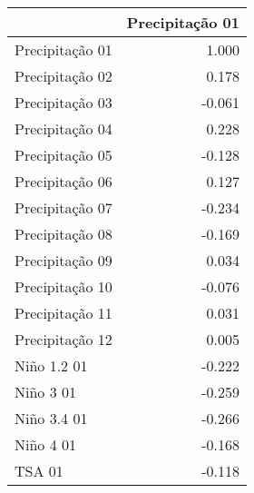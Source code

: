\begin{tabular}{lr}
\toprule
{} &  Precipitação 01 \\
\midrule
Precipitação 01 &            1.000 \\
Precipitação 02 &            0.178 \\
Precipitação 03 &           -0.061 \\
Precipitação 04 &            0.228 \\
Precipitação 05 &           -0.128 \\
Precipitação 06 &            0.127 \\
Precipitação 07 &           -0.234 \\
Precipitação 08 &           -0.169 \\
Precipitação 09 &            0.034 \\
Precipitação 10 &           -0.076 \\
Precipitação 11 &            0.031 \\
Precipitação 12 &            0.005 \\
Niño 1.2 01     &           -0.222 \\
Niño 3 01       &           -0.259 \\
Niño 3.4 01     &           -0.266 \\
Niño 4 01       &           -0.168 \\
TSA 01          &           -0.118 \\
\bottomrule
\end{tabular}
